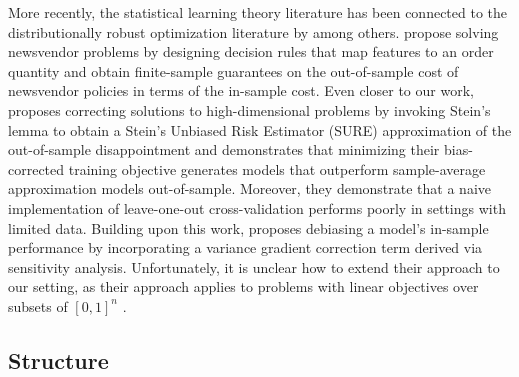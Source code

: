 \documentclass[mnsc,nonblindrev]{informs3} %
\begin{document}
More recently, the statistical learning theory literature has been connected to the distributionally robust optimization literature by \cite{ban2018machine,ban2019big, gupta2021small, gupta2022data, gupta2024debiasing} among others. \cite{ban2019big} propose solving newsvendor problems by designing decision rules that map features to an order quantity and obtain finite-sample guarantees on the out-of-sample cost of newsvendor policies in terms of the in-sample cost. Even closer to our work, \cite{gupta2021small} proposes correcting solutions to high-dimensional problems by invoking Stein's lemma to obtain a Stein's Unbiased Risk Estimator (SURE) approximation of the out-of-sample disappointment and demonstrates that minimizing their bias-corrected training objective generates models that outperform sample-average approximation models out-of-sample. {\color{black}Moreover, they demonstrate that a naive implementation of leave-one-out cross-validation performs poorly in settings with limited data. Building upon this work, \cite{gupta2024debiasing} proposes debiasing a model's in-sample performance by incorporating a variance gradient correction term derived via sensitivity analysis. Unfortunately, it is unclear how to extend their approach to our setting, as their approach applies to problems with linear objectives over subsets of $[0, 1]^n$ \citep{gupta2024debiasing}.
}



\subsection{Structure}
\end{document}
